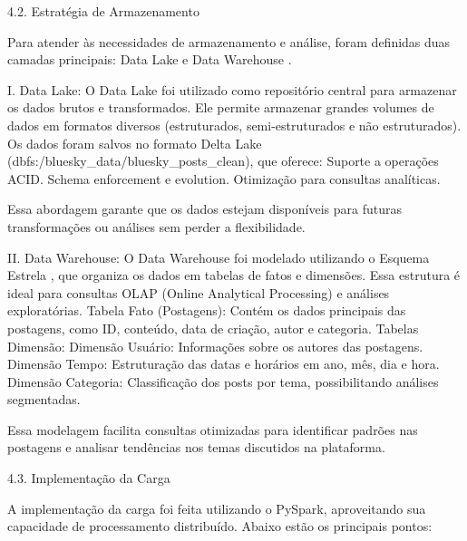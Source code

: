 \documentclass[
  letterpaper,
  DIV=11,
  numbers=noendperiod]{scrartcl}
\begin{document}
4.2. Estratégia de Armazenamento

Para atender às necessidades de armazenamento e análise, foram definidas
duas camadas principais: Data Lake e Data Warehouse .

\begin{VerbatimWithBreaks}
I. Data Lake:  
    O Data Lake  foi utilizado como repositório central para armazenar os dados brutos e transformados. Ele permite armazenar grandes volumes de dados em formatos diversos (estruturados, semi-estruturados e não estruturados).
    Os dados foram salvos no formato Delta Lake (dbfs:/bluesky_data/bluesky_posts_clean), que oferece:
        Suporte a operações ACID.
        Schema enforcement e evolution.
        Otimização para consultas analíticas.
         
    Essa abordagem garante que os dados estejam disponíveis para futuras transformações ou análises sem perder a flexibilidade.
     

II. Data Warehouse:  
    O Data Warehouse  foi modelado utilizando o Esquema Estrela , que organiza os dados em tabelas de fatos e dimensões. Essa estrutura é ideal para consultas OLAP (Online Analytical Processing) e análises exploratórias.
    Tabela Fato (Postagens):  Contém os dados principais das postagens, como ID, conteúdo, data de criação, autor e categoria.
    Tabelas Dimensão: 
        Dimensão Usuário:  Informações sobre os autores das postagens.
        Dimensão Tempo:  Estruturação das datas e horários em ano, mês, dia e hora.
        Dimensão Categoria:  Classificação dos posts por tema, possibilitando análises segmentadas.
         
    Essa modelagem facilita consultas otimizadas para identificar padrões nas postagens e analisar tendências nos temas discutidos na plataforma.
     
 
\end{VerbatimWithBreaks}

4.3. Implementação da Carga

A implementação da carga foi feita utilizando o PySpark, aproveitando
sua capacidade de processamento distribuído. Abaixo estão os principais
pontos:
\end{document}

